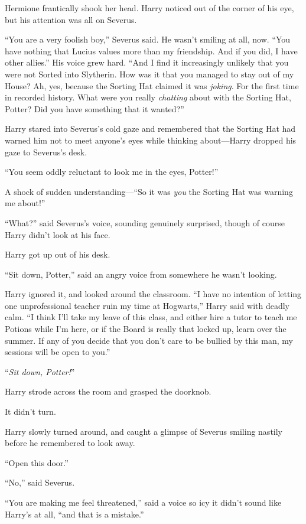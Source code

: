 Hermione frantically shook her head. Harry noticed out of the corner of his eye, but his attention was all on Severus.

“You are a very foolish boy,” Severus said. He wasn’t smiling at all, now. “You have nothing that Lucius values more than my friendship. And if you did, I have other allies.” His voice grew hard. “And I find it increasingly unlikely that you were not Sorted into Slytherin. How was it that you managed to stay out of my House? Ah, yes, because the Sorting Hat claimed it was \emph{joking}. For the first time in recorded history. What were you really \emph{chatting} about with the Sorting Hat, Potter? Did you have something that it wanted?”

Harry stared into Severus’s cold gaze and remembered that the Sorting Hat had warned him not to meet anyone’s eyes while thinking about—Harry dropped his gaze to Severus’s desk.

“You seem oddly reluctant to look me in the eyes, Potter!”

A shock of sudden understanding—“So it was \emph{you} the Sorting Hat was warning me about!”

“What?” said Severus’s voice, sounding genuinely surprised, though of course Harry didn’t look at his face.

Harry got up out of his desk.

“Sit down, Potter,” said an angry voice from somewhere he wasn’t looking.

Harry ignored it, and looked around the classroom. “I have no intention of letting one unprofessional teacher ruin my time at Hogwarts,” Harry said with deadly calm. “I think I’ll take my leave of this class, and either hire a tutor to teach me Potions while I’m here, or if the Board is really that locked up, learn over the summer. If any of you decide that you don’t care to be bullied by this man, my sessions will be open to you.”

“\emph{Sit down, Potter!}”

Harry strode across the room and grasped the doorknob.

It didn’t turn.

Harry slowly turned around, and caught a glimpse of Severus smiling nastily before he remembered to look away.

“Open this door.”

“No,” said Severus.

“You are making me feel threatened,” said a voice so icy it didn’t sound like Harry’s at all, “and that is a mistake.”

